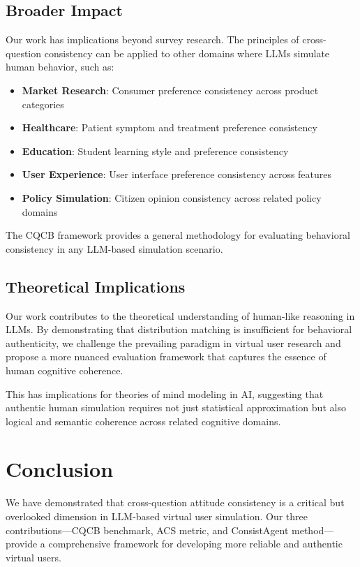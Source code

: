 \documentclass[sigconf, anonymous]{acmart}
\begin{document}
\subsection{Broader Impact}

Our work has implications beyond survey research. The principles of cross-question consistency can be applied to other domains where LLMs simulate human behavior, such as:

\begin{itemize}
    \item \textbf{Market Research}: Consumer preference consistency across product categories
    \item \textbf{Healthcare}: Patient symptom and treatment preference consistency
    \item \textbf{Education}: Student learning style and preference consistency
    \item \textbf{User Experience}: User interface preference consistency across features
    \item \textbf{Policy Simulation}: Citizen opinion consistency across related policy domains
\end{itemize}

The CQCB framework provides a general methodology for evaluating behavioral consistency in any LLM-based simulation scenario.

\subsection{Theoretical Implications}

Our work contributes to the theoretical understanding of human-like reasoning in LLMs. By demonstrating that distribution matching is insufficient for behavioral authenticity, we challenge the prevailing paradigm in virtual user research and propose a more nuanced evaluation framework that captures the essence of human cognitive coherence.

This has implications for theories of mind modeling in AI, suggesting that authentic human simulation requires not just statistical approximation but also logical and semantic coherence across related cognitive domains.

\section{Conclusion}

We have demonstrated that cross-question attitude consistency is a critical but overlooked dimension in LLM-based virtual user simulation. Our three contributions—CQCB benchmark, ACS metric, and ConsistAgent method—provide a comprehensive framework for developing more reliable and authentic virtual users.
\end{document}

